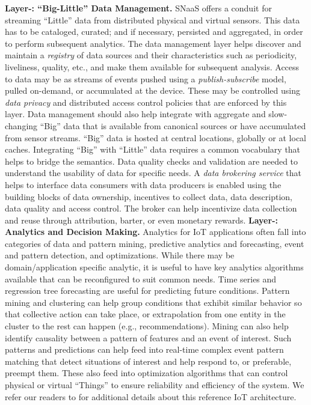 \documentclass[conference]{IEEEtran}
\begin{document}
\vspace{1mm}
\newline
\noindent
 \textbf{Layer-: ``Big-Little'' Data Management.}
SNaaS offers a conduit for streaming ``Little'' data from distributed physical and virtual sensors. 
This data has to be cataloged, curated; and if necessary, persisted and aggregated, in order to perform subsequent analytics. 
The data management layer helps discover and maintain a \emph{registry} of data sources and their characteristics such as periodicity, liveliness, quality, etc., and make them available for subsequent analysis. 
Access to data may be as streams of events pushed using a \emph{publish-subscribe} model, pulled on-demand, or accumulated at the device. These may be controlled using \emph{data privacy} and distributed access control policies that are enforced by this layer. 
\newline
\indent
Data management should also help integrate with aggregate and slow-changing ``Big'' data that is available from canonical sources or have accumulated from sensor streams. 
``Big'' data is hosted at central locations, globally or at local caches. Integrating ``Big'' with ``Little'' data requires a common vocabulary that helps to bridge the semantics.
Data quality checks and validation are needed to understand the usability of data for specific needs.
\newline
\indent
A \emph{data brokering service} that helps to interface data consumers with data producers is enabled using the building blocks of data ownership, incentives to collect data, data description, data quality and access control. 
The broker can help incentivize data collection and reuse through attribution, barter, or even monetary rewards.
\vspace{1mm}
\newline
\newline
\noindent
 \textbf{Layer-: Analytics and Decision Making.}
Analytics for IoT applications often fall into categories of data and pattern mining, predictive analytics and forecasting, event and pattern detection, and optimizations. 
While there may be domain/application specific analytic, it is useful to have key analytics algorithms available that can be reconfigured to suit common needs. 
Time series and regression tree forecasting are useful for predicting future conditions.
Pattern mining and clustering can help group conditions that exhibit similar behavior so that collective action can take place, or extrapolation from one entity in the cluster to the rest can happen (e.g., recommendations)\cite{ddmm2011}.
Mining can also help identify causality between a pattern of features and an event of interest.
Such patterns and predictions can help feed into real-time complex event pattern matching\cite{govindarajanSJM14} that detect situations of interest and help
respond to, or preferable, preempt them. 
These also feed into optimization algorithms that can control physical or virtual ``Things'' to ensure reliability and efficiency of the system.
\newline
\indent
We refer our readers to \cite{IoT-IISc,IoT-India} for additional details about this reference IoT architecture. 
\end{document}
